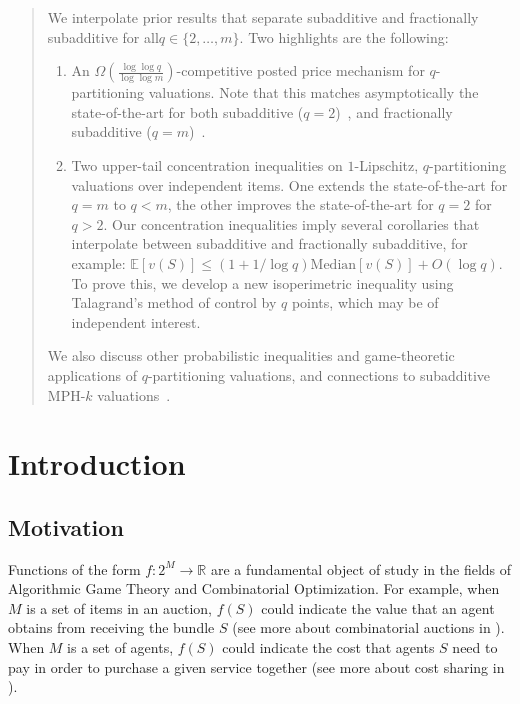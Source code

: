 \documentclass[11pt]{article}%
\numberwithin{theorem}{subsection}
\newcommand{\prob}{\mathbf{P}}
\newcommand{\median}{\mathbf{Med}}
\begin{document}
\begin{abstract}
We interpolate prior results that separate subadditive and fractionally subadditive for all\linebreak $q \in \{2,\ldots, m\}$. Two highlights are the following:
\begin{enumerate}
\item[i)] An $\Omega \left(\frac{\log \log q}{\log \log m}\right)$-competitive posted price mechanism for $q$-partitioning valuations. Note that this matches asymptotically the state-of-the-art for both subadditive ($q=2$)~\cite{DuttingKL20}, and fractionally subadditive ($q=m$)~\cite{FeldmanGL15}.
\item[ii)]  Two upper-tail concentration inequalities on $1$-Lipschitz, $q$-partitioning valuations over independent items. One extends the state-of-the-art for $q=m$ to $q<m$, the other improves the state-of-the-art for $q=2$ for $q > 2$. Our concentration inequalities imply several corollaries that interpolate between subadditive and fractionally subadditive, for example: $\mathbb{E}[v(S)]\le (1 + 1/\log q)\text{Median}[v(S)] + O(\log q)$. To prove this, we develop a new isoperimetric inequality using Talagrand's method of control by $q$ points, which may be of independent interest.%
\end{enumerate}

We also discuss other probabilistic inequalities and game-theoretic applications of $q$-partitioning valuations, and connections to subadditive MPH-$k$ valuations~\cite{EzraFNTW19}.
\end{abstract}


\addtocounter{page}{-1}
\newpage
\section{Introduction}\label{sec:intro}
\label{section:intro}
\subsection{Motivation}
Functions of the form $f:2^M\longrightarrow \mathbb{R}$ are a fundamental object of study in the fields of Algorithmic Game Theory and Combinatorial Optimization. For example, when $M$ is a set of items in an auction, $f(S)$ could indicate the value that an agent obtains from receiving the bundle $S$ (see more about combinatorial auctions in \cite[Chapter 11]{AGTbook}). When $M$ is a set of agents, $f(S)$ could indicate the cost that agents $S$ need to pay in order to purchase a given service together (see more about cost sharing in \cite[Chapter 15]{AGTbook}).
\end{document}
